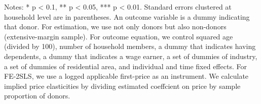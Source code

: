 \begin{table}
\begin{threeparttable}
\begin{tablenotes}
\item Notes: * p < 0.1, ** p < 0.05, *** p < 0.01. Standard errors clustered at household level are in parentheses. An outcome variable is a dummy indicating that donor. For estimation, we use not only donors but also non-donors (extensive-margin sample). For outcome equation, we control squared age (divided by 100), number of household members, a dummy that indicates having dependents, a dummy that indicates a wage earner, a set of dummies of industry, a set of dummies of residential area, and individual and time fixed effects. For FE-2SLS, we use a logged applicable first-price as an instrument. We calculate implied price elasticities by dividing estimated coeffcient on price by sample proportion of donors.
\end{tablenotes}
\end{threeparttable}
\end{table}
